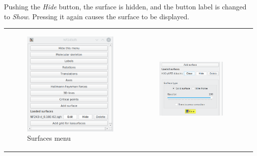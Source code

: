 \documentclass[10pt]{article}
\begin{document}
Pushing the {\it Hide} button, the surface is hidden, and the button label is changed to {\it Show}.
Pressing it again causes the surface to be displayed.

\vspace*{5mm}
\hspace*{-5mm}
\begin{tabular}{lcr}
\begin{minipage}{.3\linewidth}
    \begin{figure}[H]
        \begin{center}
            \includegraphics[width=0.8\linewidth]{damqt320_surfaces_menu.png}
        \end{center}
        \vspace*{7mm}
        \caption{Surfaces menu \label{fig:4_13_9_1}}
    \end{figure}
\end{minipage}
&
\begin{minipage}{.3\linewidth}
    \begin{figure}[H]
        \begin{center}
            \includegraphics[width=0.85\linewidth]{damqt320_basins_menu.png}

\end{center}
\end{figure}
\end{minipage}
\end{tabular}
\end{document}
